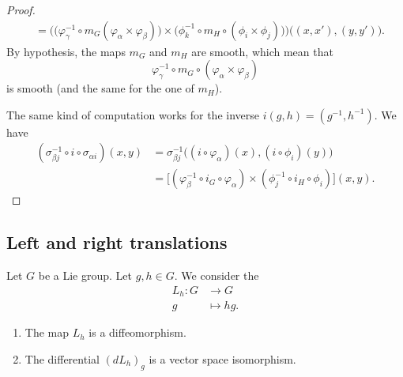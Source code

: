 \begin{proof}
\begin{subequations}
\begin{align}
			                                                                              & =\Big( \big( \varphi_{\gamma}^{-1}\circ m_G(\varphi_{\alpha}\times \varphi_{\beta}) \big)\times \big( \phi_k^{-1}\circ m_H\circ (\phi_i\times \phi_j) \big) \Big)\big( (x,x'),(y,y') \big).
		\end{align}
	\end{subequations}
	By hypothesis, the maps \( m_G\) and \( m_H\) are smooth, which mean that
	\begin{equation}
		\varphi_{\gamma}^{-1}\circ m_G\circ(\varphi_{\alpha}\times \varphi_{\beta})
	\end{equation}
	is smooth (and the same for the one of \( m_H\)).

	The same kind of computation works for the inverse \( i(g,h)=(g^{-1},h^{-1})\). We have
	\begin{subequations}
		\begin{align}
			(\sigma_{\beta j}^{-1}\circ i\circ\sigma_{\alpha i})(x,y) & =\sigma_{\beta j}^{-1}\big( (i\circ\varphi_{\alpha})(x),(i\circ\phi_i)(y) \big)                                     \\
			                                                          & = \big[  (\varphi_{\beta}^{-1}\circ i_G\circ \varphi_{\alpha})\times (\phi_j^{-1}\circ i_H\circ\phi_i)  \big](x,y).
		\end{align}
	\end{subequations}
\end{proof}


\subsection{Left and right translations}

\begin{lemma}       \label{LEMooPIUFooHjyXln}
	Let \( G\) be a Lie group. Let \( g,h\in G\). We consider the 
	\begin{equation}
		\begin{aligned}
			L_h\colon G & \to G       \\
			g           & \mapsto hg.
		\end{aligned}
	\end{equation}
	\begin{enumerate}
		\item		\label{ITEMooCDEUooAZOhkx}
		      The map \( L_h\) is a diffeomorphism.
		\item		\label{ITEMooROZYooXPFOOm}
		      The differential \( (dL_h)_g\) is a vector space isomorphism.
	\end{enumerate}
\end{lemma}

